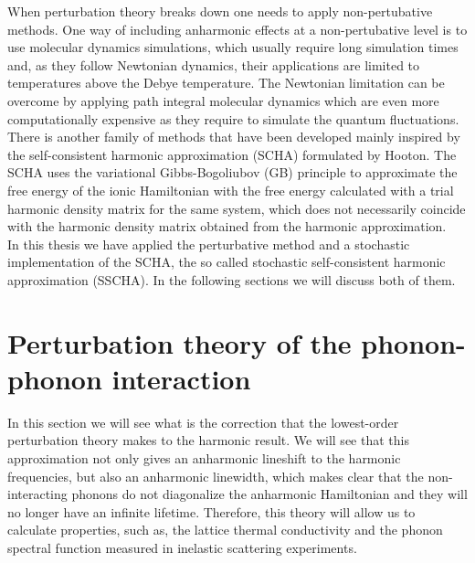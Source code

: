 When perturbation theory breaks down one needs to apply non-pertubative methods. One way of including anharmonic effects at a non-pertubative level is to use molecular dynamics 
simulations\cite{hellman2013temperature,hellman2013temperature1,hellman2011lattice,ljungberg2013temperature,magduau2013identification,wang1990tight,zhang2014phonon,de2009thermal}, which usually require long simulation
times and, as they follow Newtonian dynamics, their applications are limited to temperatures above the Debye temperature. The Newtonian limitation can be overcome by applying path integral molecular 
dynamics\cite{ceperley1995path} which are even more computationally expensive as they require to simulate the quantum fluctuations. There is another family of 
methods\cite{errea2014anharmonic,errea2013first,errea2011anharmonic,monserrat2013anharmonic,tadano2015self,georgescu2012self,brown2013self,patrick2015anharmonic,} that have been developed mainly inspired by the 
self-consistent harmonic approximation (SCHA) formulated by Hooton\cite{hooton1955li}. The SCHA uses the variational Gibbs-Bogoliubov (GB) principle to approximate the free energy of the ionic Hamiltonian with 
the free energy calculated with a trial harmonic density matrix for the same system, which does not necessarily coincide with the harmonic density matrix obtained from the harmonic approximation. \\

In this thesis we have applied the perturbative method\cite{paulatto2013anharmonic} and a stochastic implementation of the SCHA, the so called stochastic self-consistent 
harmonic approximation (SSCHA)\cite{errea2014anharmonic,errea2013first}. In the following sections we will discuss both of them.

\section{Perturbation theory of the phonon-phonon interaction}
\label{perturbation-theory-third}

In this section we will see what is the correction that the lowest-order perturbation theory makes to the harmonic result. We will see that this approximation not only gives an anharmonic lineshift to the harmonic 
frequencies, but also an anharmonic linewidth, which makes clear that the non-interacting phonons do not diagonalize the anharmonic Hamiltonian and they will no longer have an infinite lifetime. Therefore, this 
theory will allow us to calculate properties, such as, the lattice thermal conductivity and the phonon spectral function measured in inelastic scattering experiments. \\

